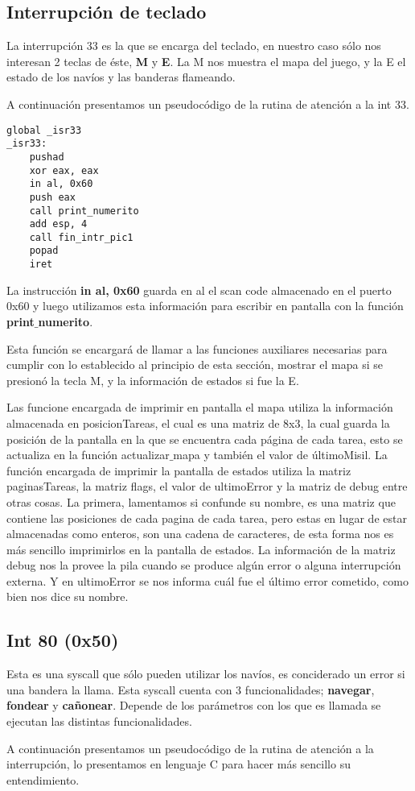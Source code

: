 \subsection{Interrupción de teclado}
\par{La interrupción 33 es la que se encarga del teclado, en nuestro caso sólo nos interesan 2 teclas de éste, \textbf{M} y \textbf{E}. La M nos muestra el mapa del juego, y la E el estado de los navíos y las banderas flameando.}
\par{A continuación presentamos un pseudocódigo de la rutina de atención a la int 33.}
\begin{lstlisting}[language={[x86masm]Assembler}]
global _isr33
_isr33:
    pushad
    xor eax, eax
    in al, 0x60
    push eax
    call print_numerito
    add esp, 4
    call fin_intr_pic1
    popad
    iret
\end{lstlisting}
\par{La instrucción \textbf{in al, 0x60} guarda en al el scan code almacenado en el puerto 0x60 y luego utilizamos esta información para escribir en pantalla con la función \textbf{print$\_$numerito}.}
\par{Esta función se encargará de llamar a las funciones auxiliares necesarias para cumplir con lo establecido al principio de esta sección, mostrar el mapa si se presionó la tecla M, y la información de estados si fue la E.}
\par{Las funcione encargada de imprimir en pantalla el mapa utiliza la información almacenada en posicionTareas, el cual es una matriz de 8x3, la cual guarda la posición de la pantalla en la que se encuentra cada página de cada tarea, esto se actualiza en la función actualizar$\_$mapa y también el valor de últimoMisil. La función encargada de imprimir la pantalla de estados utiliza la matriz paginasTareas, la matriz flags, el valor de ultimoError y la matriz de debug entre otras cosas. La primera, lamentamos si confunde su nombre, es una matriz que contiene las posiciones de cada pagina de cada tarea, pero estas en lugar de estar almacenadas como enteros, son una cadena de caracteres, de esta forma nos es más sencillo imprimirlos en la pantalla de estados. La información de la matriz debug nos la provee la pila cuando se produce algún error o alguna interrupción externa. Y en ultimoError se nos informa cuál fue el último error cometido, como bien nos dice su nombre.}
\subsection{Int 80 (0x50)}
\par{Esta es una syscall que sólo pueden utilizar los navíos, es conciderado un error si una bandera la llama. Esta syscall cuenta con 3 funcionalidades; \textbf{navegar}, \textbf{fondear} y \textbf{cañonear}. Depende de los parámetros con los que es llamada se ejecutan las distintas funcionalidades.}
\par{A continuación presentamos un pseudocódigo de la rutina de atención a la interrupción, lo presentamos en lenguaje C para hacer más sencillo su entendimiento.}

